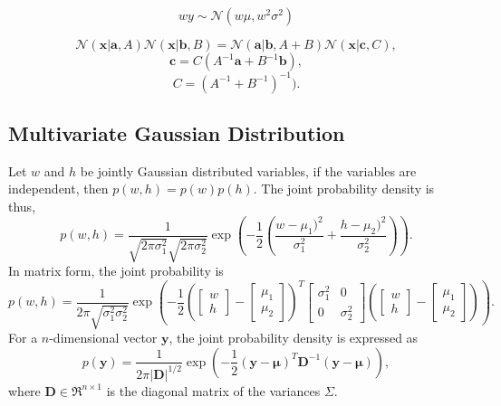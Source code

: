 \documentclass[ %
author={Dillon Keith Diep},
supervisor={Dr. Carl Henrik Ek},
degree={MEng},
title={ART-CG:},
subtitle={Assisted Real-time Content Generation of 3D Hair by Learning Manifolds},
type={Research},
year={2017} ]{dissertation}
\begin{document}
\begin{equation} \label{gd:scale}
wy\sim\mathcal{N}(w\mu,w^2\sigma^2)
\end{equation}

\begin{equation} \label{gd:prod}
\mathcal{N}(\bm{x|a},A)\mathcal{N}(\bm{x|b},B) = \mathcal{N}(\bm{a|b},A+B)\mathcal{N}(\bm{x}|\bm{c}, C),
\end{equation}
$$\bm{c}=C(A^{-1}\bm{a}+B^{-1}\bm{b}),$$
$$C = (A^{-1}+B^{-1})^{-1}).$$


\subsection{Multivariate Gaussian Distribution}
\noindent
Let $w$ and $h$ be jointly Gaussian distributed variables, if the variables are independent, then $p(w,h)=p(w)p(h)$.
The joint probability density is thus,
$$p(w,h)=\frac{1}{\sqrt{2\pi\sigma^2_1}\sqrt{2\pi\sigma^2_2}}\exp\left(-\frac{1}{2}\left(\frac{w-\mu_1)^2}{\sigma^2_1}+\frac{h-\mu_2)^2}{\sigma^2_2}\right)\right).$$
In matrix form, the joint probability is
$$p(w,h)=\frac{1}{2\pi\sqrt{\sigma^2_1\sigma^2_2}}\exp
\left(
-\frac{1}{2}
\left(
\left[
\begin{matrix}
w \\
h
\end{matrix}
\right]
-
\left[
\begin{matrix}
\mu_1 \\
\mu_2
\end{matrix}
\right]
\right)^T
\left[
\begin{matrix}
\sigma^2_1  &   0\\
0           &   \sigma^2_2
\end{matrix}
\right]
\left(
\left[
\begin{matrix}
w \\
h
\end{matrix}
\right]
-
\left[
\begin{matrix}
\mu_1 \\
\mu_2
\end{matrix}
\right]
\right)
\right).$$
For a $n$-dimensional vector $\bm{y}$, the joint probability density is expressed as
\begin{equation} \label{jointpd}
p(\bm{y})=\frac{1}{2\pi|\bm{D}|^{1/2}}\exp\left(-\frac{1}{2}(\bm{y}-\bm{\mu})^T\bm{D}^{-1}(\bm{y}-\bm{\mu})\right),
\end{equation}
where $\bm{D}\in\Re^{n \times 1}$ is the diagonal matrix of the variances $\Sigma$\cite[p.78]{bishop}.
\end{document}
